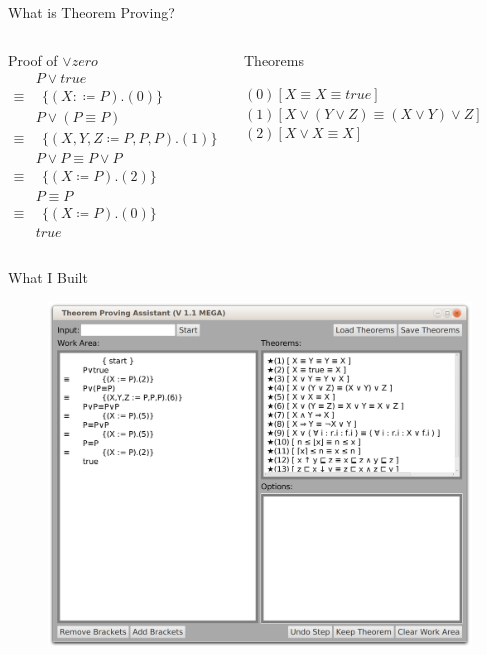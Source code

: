 \documentclass[11pt]{beamer}
\begin{document}
\begin{frame}{What is Theorem Proving?}

\begin{columns}[c] 

\begin{block}{Proof of $\vee zero$}
\begin{align*}
&P \vee true \\
\equiv&\ \ \{(X:\coloneqq P).(0)\} \\
&P \vee ( P \equiv P ) \\
\equiv&\ \ \{(X,Y,Z\coloneqq P,P,P ).(1)\} \\
&P \vee P \equiv P \vee P \\
\equiv&\ \ \{(X \coloneqq P).(2)\} \\
&P \equiv P \\
\equiv&\ \ \{(X \coloneqq P).(0)\} \\
& true
\end{align*}
\end{block}

\begin{block}{Theorems}

$(0) [X \equiv X \equiv true ]$\\
$(1) [X \vee (Y\vee Z) \equiv (X\vee Y) \vee Z]$\\
$(2) [X \vee X \equiv X]$

\end{block}

\end{columns}

\end{frame}

\begin{frame}{What I Built}
\begin{figure}
\includegraphics[width=0.8\linewidth]{../TheReport/screenshot}
\end{figure}
\end{frame}
\end{document}
